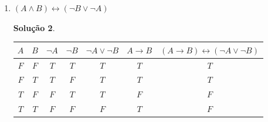 \documentclass[11pt,a4paper]{report}
\newtheorem*{Solucao}{Solu\c{c}\~ao}
\newcommand{\F}{$F$}
\newcommand{\T}{$T$}
\begin{document}
\begin{enumerate}
\begin{enumerate}
\begin{Solucao}
                    tautologia.
                    \end{Solucao}
		\item $(A\land B)\leftrightarrow(\neg B\lor \neg A)$
                  \begin{Solucao}
                    \verb| |\\
                    \begin{tabular}{|c|c|c|c|c|c|c|}
                      \hline
                      $A$ & $B$ & $\neg A$ & $\neg B$ & $\neg A \lor
                      \neg B$ & $A \to B$ & $(A \to B) \leftrightarrow
                      (\neg A \lor \neg B)$\\ \hline
                      \F & \F & \T & \T & \T & \T & \T \\
                      \F & \T & \T & \F & \T & \T & \T \\
                      \T & \F & \F & \T & \T & \F & \F \\
                      \T & \T & \F & \F & \F & \T & \F \\ \hline
                      \end{tabular}


\end{Solucao}
\end{enumerate}
\end{enumerate}
\end{document}
